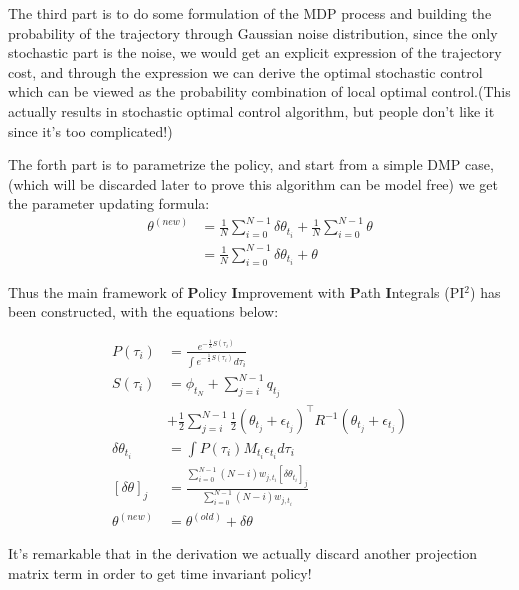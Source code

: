 \documentclass[journal]{IEEEtran}
\begin{document}
The third part is to do some formulation of the MDP process and building the probability of the trajectory through Gaussian noise distribution,
since the only stochastic part is the noise, we would get an explicit expression of the trajectory cost, and through the expression we can derive the
optimal stochastic control which can be viewed as the probability combination of local optimal control.(This actually results in stochastic optimal control algorithm,
but people don't like it since it's too complicated!)

The forth part is to parametrize the policy, and start from a simple DMP case,(which will be discarded later to prove this algorithm can be model free) we get the parameter updating formula:
\begin{equation}
    \begin{aligned}
    \theta^{(new)} &= \frac{1}{N} \sum_{i = 0}^{N-1} \delta \theta_{t_i} + \frac{1}{N} \sum_{i = 0}^{N-1} \theta \\
    & = \frac{1}{N} \sum_{i = 0}^{N-1} \delta \theta_{t_i} + \theta
    \end{aligned}
   \end{equation}

  Thus the main framework of \textbf{P}olicy \textbf{I}mprovement with \textbf{P}ath \textbf{I}ntegrals (PI$^2$) has been constructed, with the equations below:

   \begin{equation}
     \begin{aligned}
       P(\tau_i) & = \frac{e^{-\frac{1}{\lambda}S(\tau_i)}  }{\int e^{-\frac{1}{\lambda}S(\tau_i)}d\tau_i} \nonumber  \\
      S (\tau_i)& = \phi_{t_N}+\sum_{j=i}^{N-1}q_{t_j} \\ & + \frac{1}{2}\sum_{j=i}^{N-1}  \frac{1}{2}(\theta_{t_j} + \epsilon_{t_j})^{\top}{R}^{-1} (\theta_{t_j} + \epsilon_{t_j})\\ 
      \delta \theta_{t_i} & = \int P(\tau_i) M_{t_i} \epsilon_{t_i} d\tau_i \\
      [\delta \theta ]_j &=  \frac{\sum_{ i= 0}^{N-1}(N-i)w_{j, t_i}[\delta \theta_{t_i}]_j}{\sum_{ i= 0}^{N-1}(N-i)w_{j, t_i}} \\ 
      \theta^{(new)} & = \theta^{(old)} + \delta \theta
     \end{aligned}
   \end{equation}
  
It's remarkable that in the derivation we actually discard another projection matrix term in order to get time invariant policy!
\end{document}
